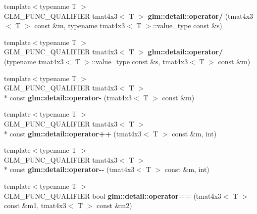 \begin{DoxyCompactItemize}
\item 
\hypertarget{namespaceglm_1_1detail_a2785f9fcdd529ebe0e64c659af185666}{{\footnotesize template$<$typename T $>$ }\\G\-L\-M\-\_\-\-F\-U\-N\-C\-\_\-\-Q\-U\-A\-L\-I\-F\-I\-E\-R tmat4x3$<$ T $>$ {\bfseries glm\-::detail\-::operator/} (tmat4x3$<$ T $>$ const \&m, typename tmat4x3$<$ T $>$\-::value\-\_\-type const \&s)}\label{namespaceglm_1_1detail_a2785f9fcdd529ebe0e64c659af185666}

\item 
\hypertarget{namespaceglm_1_1detail_a1d12379a663391989f9459dc27c2fa25}{{\footnotesize template$<$typename T $>$ }\\G\-L\-M\-\_\-\-F\-U\-N\-C\-\_\-\-Q\-U\-A\-L\-I\-F\-I\-E\-R tmat4x3$<$ T $>$ {\bfseries glm\-::detail\-::operator/} (typename tmat4x3$<$ T $>$\-::value\-\_\-type const \&s, tmat4x3$<$ T $>$ const \&m)}\label{namespaceglm_1_1detail_a1d12379a663391989f9459dc27c2fa25}

\item 
\hypertarget{namespaceglm_1_1detail_afd8ceb48f695c871885be7d7d39c2199}{{\footnotesize template$<$typename T $>$ }\\G\-L\-M\-\_\-\-F\-U\-N\-C\-\_\-\-Q\-U\-A\-L\-I\-F\-I\-E\-R tmat4x3$<$ T $>$\\*
 const {\bfseries glm\-::detail\-::operator-\/} (tmat4x3$<$ T $>$ const \&m)}\label{namespaceglm_1_1detail_afd8ceb48f695c871885be7d7d39c2199}

\item 
\hypertarget{namespaceglm_1_1detail_a6d8f2ccdc37c13b0d1d5a6f1b68de449}{{\footnotesize template$<$typename T $>$ }\\G\-L\-M\-\_\-\-F\-U\-N\-C\-\_\-\-Q\-U\-A\-L\-I\-F\-I\-E\-R tmat4x3$<$ T $>$\\*
 const {\bfseries glm\-::detail\-::operator++} (tmat4x3$<$ T $>$ const \&m, int)}\label{namespaceglm_1_1detail_a6d8f2ccdc37c13b0d1d5a6f1b68de449}

\item 
\hypertarget{namespaceglm_1_1detail_a172c90716fd876b8e2e88fde8ab9b510}{{\footnotesize template$<$typename T $>$ }\\G\-L\-M\-\_\-\-F\-U\-N\-C\-\_\-\-Q\-U\-A\-L\-I\-F\-I\-E\-R tmat4x3$<$ T $>$\\*
 const {\bfseries glm\-::detail\-::operator-\/-\/} (tmat4x3$<$ T $>$ const \&m, int)}\label{namespaceglm_1_1detail_a172c90716fd876b8e2e88fde8ab9b510}

\item 
\hypertarget{namespaceglm_1_1detail_a2a4ee64a78ceb64b6ad84b7bd5f7fc1f}{{\footnotesize template$<$typename T $>$ }\\G\-L\-M\-\_\-\-F\-U\-N\-C\-\_\-\-Q\-U\-A\-L\-I\-F\-I\-E\-R bool {\bfseries glm\-::detail\-::operator==} (tmat4x3$<$ T $>$ const \&m1, tmat4x3$<$ T $>$ const \&m2)}\label{namespaceglm_1_1detail_a2a4ee64a78ceb64b6ad84b7bd5f7fc1f}


\end{DoxyCompactItemize}
